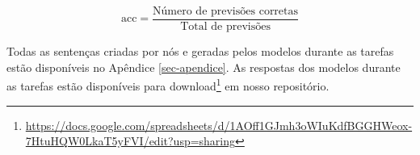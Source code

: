 \begin{equation}
    \text{acc} = \frac{\text{Número de previsões corretas}}{\text{Total de previsões}}
    \label{eq_1}
\end{equation}

Todas as sentenças criadas por nós e geradas pelos modelos durante as tarefas estão disponíveis no Apêndice \ref{sec-apendice}. As respostas dos modelos durante as tarefas estão disponíveis para download\footnote{\url{https://docs.google.com/spreadsheets/d/1AOff1GJmh3oWIuKdfBGGHWeox-7HtuHQW0LkaT5yFVI/edit?usp=sharing}} em nosso repositório.


